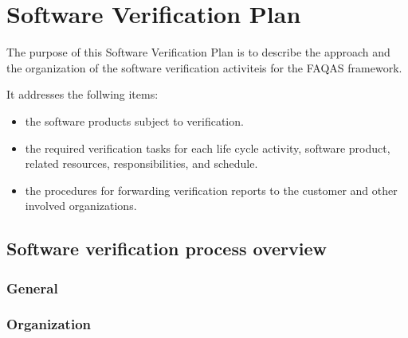 \chapter{Software Verification Plan}
The purpose of this Software Verification Plan is to describe the approach and the organization of the software verification activiteis for the FAQAS framework.

It addresses the follwing items:
\begin{itemize}
  \item the software products
  subject to verification.
  \item the required verification tasks for each life cycle activity, software product, related resources, responsibilities, and schedule.
  \item the procedures for forwarding verification reports to the customer and other involved organizations.
\end{itemize}

\section{Software verification process overview}

\subsection{General}


\subsection{Organization}

